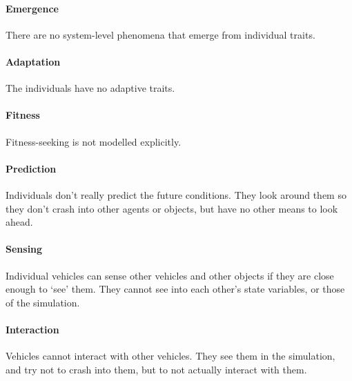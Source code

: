 

\paragraph{Emergence} 
There are no system-level phenomena that emerge from individual traits.

\paragraph{Adaptation} 
The individuals have no adaptive traits.

\paragraph{Fitness} 
Fitness-seeking is not modelled explicitly. 

\paragraph{Prediction} 
Individuals don't really predict the future conditions. They look around them so they don't crash into other agents or objects, but have no other means to look ahead. 

\paragraph{Sensing} 
Individual vehicles can sense other vehicles and other objects if they are close enough to `see' them. They cannot see into each other's state variables, or those of the simulation. 

\paragraph{Interaction} 
Vehicles cannot interact with other vehicles. They see them in the simulation, and try not to crash into them, but to not actually interact with them.

